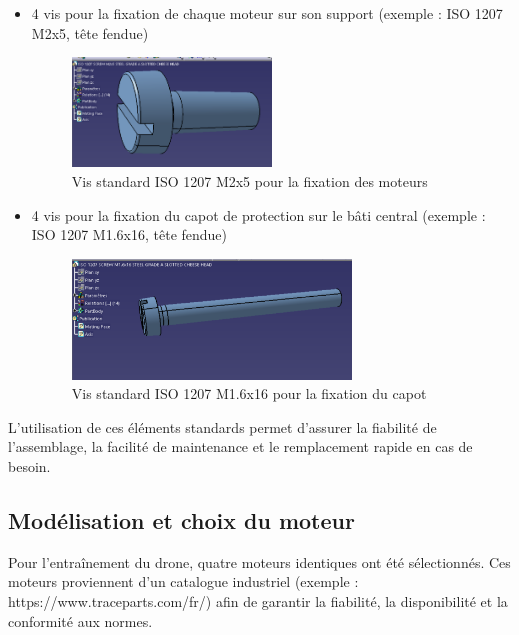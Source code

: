\documentclass[a4paper,12pt]{report}
\begin{document}
\begin{itemize}
    \item 4 vis pour la fixation de chaque moteur sur son support (exemple : ISO 1207 M2x5, tête fendue)
    \begin{figure}[H]
        \centering
        \includegraphics[width=0.5\textwidth]{images/vis_iso_m2x5.png}
        \caption{Vis standard ISO 1207 M2x5 pour la fixation des moteurs}
        \label{fig:vis_iso_m2x5}
    \end{figure}
    \item 4 vis pour la fixation du capot de protection sur le bâti central (exemple : ISO 1207 M1.6x16, tête fendue)
    \begin{figure}[H]
        \centering
        \includegraphics[width=0.7\textwidth]{images/vis_iso_m1_6x16.png}
        \caption{Vis standard ISO 1207 M1.6x16 pour la fixation du capot}
        \label{fig:vis_iso_m1_6x16}
    \end{figure}
\end{itemize}

L'utilisation de ces éléments standards permet d'assurer la fiabilité de l'assemblage, la facilité de maintenance et le remplacement rapide en cas de besoin.

\subsection{Modélisation et choix du moteur}
Pour l'entraînement du drone, quatre moteurs identiques ont été sélectionnés. Ces moteurs proviennent d'un catalogue industriel (exemple : https://www.traceparts.com/fr/) afin de garantir la fiabilité, la disponibilité et la conformité aux normes.
\end{document}
